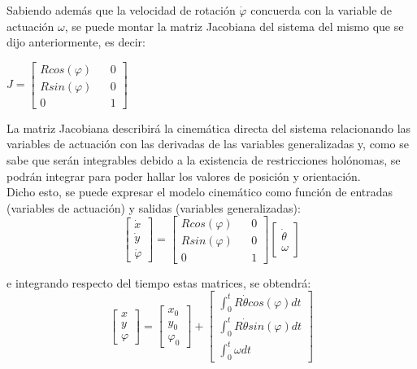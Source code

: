 \documentclass[a4paper,twoside]{article}
\begin{document}
	Sabiendo además que la velocidad de rotación $\dot{\varphi}$ concuerda con la variable de actuación $\omega$, se puede montar la matriz Jacobiana del sistema del mismo que se dijo anteriormente, es decir:
\begin{center}
		$
		J=
		\begin{bmatrix}
			R cos(\varphi) && 0\\
			R sin(\varphi) && 0\\
			0 && 1
		\end{bmatrix}
		$
\end{center}

La matriz Jacobiana describirá la cinemática directa del sistema relacionando las variables de actuación con las derivadas de las variables generalizadas y, como se sabe que serán integrables debido a la existencia de restricciones holónomas, se podrán integrar para poder hallar los valores de posición y orientación.\\

	Dicho esto, se puede expresar el modelo cinemático como función de entradas (variables de actuación) y salidas (variables generalizadas):
	\begin{equation}
		\begin{bmatrix}
		\dot{x}\\
		\dot{y}\\
		\dot{\varphi}
		\end{bmatrix}
		=
		\begin{bmatrix}
		R cos(\varphi) && 0\\
		R sin(\varphi) && 0\\
		0 && 1
		\end{bmatrix}
		\begin{bmatrix}
		\dot{\theta}\\
		\omega
		\end{bmatrix}
	\end{equation}

	e integrando respecto del tiempo estas matrices, se obtendrá:
		\begin{equation}
		\begin{bmatrix}
		x\\
		y\\
		\varphi
		\end{bmatrix}
		=
		\begin{bmatrix}
		x_0\\
		y_0\\
		\varphi_0
		\end{bmatrix}
		+
		\begin{bmatrix}
		\int_{0}^{t} R\dot{\theta}cos(\varphi)dt\\
		\int_{0}^{t} R\dot{\theta}sin(\varphi)dt\\
		\int_{0}^{t} \omega dt
		\end{bmatrix}
	\end{equation}
\end{document}
